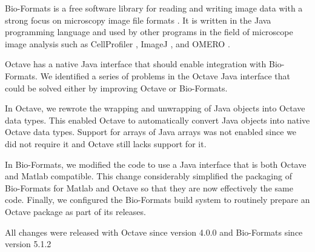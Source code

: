 Bio-Formats is a free software library for reading and writing image
data with a strong focus on microscopy image file formats
\citep{bioformats}.  It is written in the Java programming language and
used by other programs in the field of microscope image analysis such
as CellProfiler \citep{cellprofiler}, ImageJ \cite{imagej2}, and OMERO
\citep{omero}.

Octave has a native Java interface that should enable integration with
Bio-Formats.
We identified a series of problems in the Octave Java interface that
could be solved either by improving Octave or Bio-Formats.

In Octave, we rewrote the wrapping and unwrapping of Java objects 
into Octave data types.  This enabled Octave to automatically
convert Java objects into native Octave data types.
Support for arrays of Java arrays was not enabled
since we did not require it and Octave still lacks
support for it.

In Bio-Formats, we modified the code to use a Java interface that is
both Octave and Matlab compatible.
This change considerably  simplified the packaging of
Bio-Formats for Matlab and Octave so that they are now
effectively the same code.
Finally, we configured the Bio-Formats build system 
to routinely prepare an Octave package as part of its releases.

All changes were released with Octave since version 4.0.0 and
Bio-Formats since version 5.1.2

